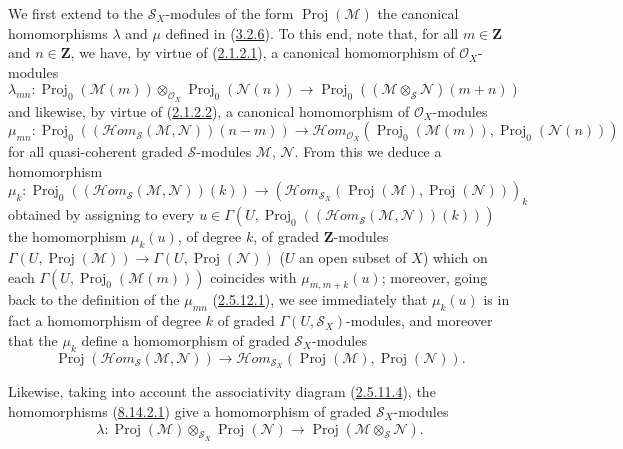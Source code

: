 \begin{env}[8.14.2]
\label{II.8.14.2}
We first extend to the $\mathcal{S}_X$-modules of the form
$\operatorname{Proj}(\mathcal{M})$ the canonical homomorphisms $\lambda$
and $\mu$ defined in (\hyperref[II.3.2.6]{3.2.6}). To this end, note
that, for all $m\in\mathbf{Z}$ and $n\in\mathbf{Z}$, we have, by virtue
of (\hyperref[II.2.1.2.1]{2.1.2.1}), a canonical homomorphism of
$\mathcal{O}_X$-modules
\begin{equation}
\label{II.8.14.2.1}
  \lambda_{mn}:\operatorname{Proj}_0(\mathcal{M}(m))
  \otimes_{\mathcal{O}_X}\operatorname{Proj}_0(\mathcal{N}(n))
  \to\operatorname{Proj}_0
  ((\mathcal{M}\otimes_{\mathcal{S}}\mathcal{N})(m+n))
\tag{8.14.2.1}
\end{equation}
and likewise, by virtue of (\hyperref[II.2.1.2.2]{2.1.2.2}), a
canonical homomorphism of $\mathcal{O}_X$-modules
\begin{equation}
\label{II.8.14.2.2}
  \mu_{mn}:\operatorname{Proj}_0
  ((\mathcal{H}om_{\mathcal{S}}(\mathcal{M},\mathcal{N}))(n-m))
  \to\mathcal{H}om_{\mathcal{O}_X}
  (\operatorname{Proj}_0(\mathcal{M}(m)),
   \operatorname{Proj}_0(\mathcal{N}(n)))
\tag{8.14.2.2}
\end{equation}
for all quasi-coherent graded $\mathcal{S}$-modules
$\mathcal{M}$, $\mathcal{N}$. From this we deduce a homomorphism
\[
  \mu_k:\operatorname{Proj}_0
  ((\mathcal{H}om_{\mathcal{S}}(\mathcal{M},\mathcal{N}))(k))
  \to
  (\mathcal{H}om_{\mathcal{S}_X}
  (\operatorname{Proj}(\mathcal{M}),\operatorname{Proj}(\mathcal{N})))_k
\]
obtained by assigning to every
$u\in\Gamma(U,\operatorname{Proj}_0
((\mathcal{H}om_{\mathcal{S}}(\mathcal{M},\mathcal{N}))(k)))$
the homomorphism $\mu_k(u)$, of degree $k$, of graded $\mathbf{Z}$-modules
$\Gamma(U,\operatorname{Proj}(\mathcal{M}))\to
\Gamma(U,\operatorname{Proj}(\mathcal{N}))$ ($U$ an open subset of $X$) which
on each $\Gamma(U,\operatorname{Proj}_0(\mathcal{M}(m)))$ coincides with
$\mu_{m,m+k}(u)$; moreover, going back to the definition of the $\mu_{mn}$
(\hyperref[II.2.5.12.1]{2.5.12.1}), we see immediately that $\mu_k(u)$ is
in fact a homomorphism of degree $k$ of graded
$\Gamma(U,\mathcal{S}_X)$-modules, and moreover that the $\mu_k$
define a homomorphism of graded $\mathcal{S}_X$-modules
\begin{equation}
\label{II.8.14.2.3}
  \operatorname{Proj}
  (\mathcal{H}om_{\mathcal{S}}(\mathcal{M},\mathcal{N}))
  \to\mathcal{H}om_{\mathcal{S}_X}
  (\operatorname{Proj}(\mathcal{M}),\operatorname{Proj}(\mathcal{N})).
\tag{8.14.2.3}
\end{equation}

Likewise, taking into account the associativity diagram
(\hyperref[II.2.5.11.4]{2.5.11.4}), the homomorphisms
(\hyperref[II.8.14.2.1]{8.14.2.1}) give a homomorphism of
graded $\mathcal{S}_X$-modules
\begin{equation}
\label{II.8.14.2.4}
  \lambda:\operatorname{Proj}(\mathcal{M})
  \otimes_{\mathcal{S}_X}\operatorname{Proj}(\mathcal{N})
  \to\operatorname{Proj}(\mathcal{M}\otimes_{\mathcal{S}}\mathcal{N}).
\tag{8.14.2.4}
\end{equation}
\end{env}

